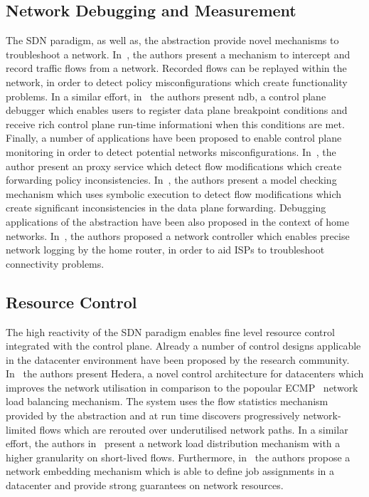 \subsection{Network Debugging and Measurement}

The SDN paradigm, as well as, the \of abstraction provide novel mechanisms to
troubleshoot a network. In~\cite{Wundsam11}, the authors present a mechanism to
intercept and record traffic flows from a network. Recorded flows can be
replayed within the network, in order to detect policy misconfigurations which
create functionality problems. In a similar effort, in~\cite{Handigol12b} the
authors present ndb, a control plane debugger which enables users to register
data plane breakpoint conditions and receive rich control plane run-time
informationi when this conditions are met. Finally, a number of applications
have been proposed to enable control plane monitoring in order to detect
potential networks misconfigurations. In~\cite{Khurshid12}, the author present
an \of proxy service which detect flow modifications which create
forwarding policy inconsistencies.  In~\cite{Canini12}, the authors present a model
checking mechanism which uses symbolic execution to detect flow modifications
which create significant inconsistencies in the data plane forwarding.
Debugging applications of the \of abstraction have been also proposed in the
context of home networks.  In~\cite{Calvert10}, the authors proposed a network
controller which enables precise network logging by the home router, in
order to aid ISPs to troubleshoot connectivity problems. 


\subsection{Resource Control}

The high reactivity of the SDN paradigm 
enables fine level resource control integrated with the control plane.
Already a number of control designs applicable in the datacenter environment
have been proposed by the research community. 
In~\cite{Al-Fares10} the authors present Hedera, a
novel control architecture for datacenters which improves the network
utilisation in comparison to the popoular ECMP~\cite{RFC2992} network load
balancing mechanism. The system uses the flow statistics mechanism provided by
the \of abstraction and at run time discovers progressively network-limited
flows which are rerouted over underutilised network paths. In a similar
effort, the authors in~\cite{Benson11} present a network load distribution mechanism
with a higher granularity on short-lived flows. Furthermore,
in~\cite{Even12} the authors propose a network embedding mechanism which is able
to define job assignments in a datacenter and provide strong guarantees on
network resources.

